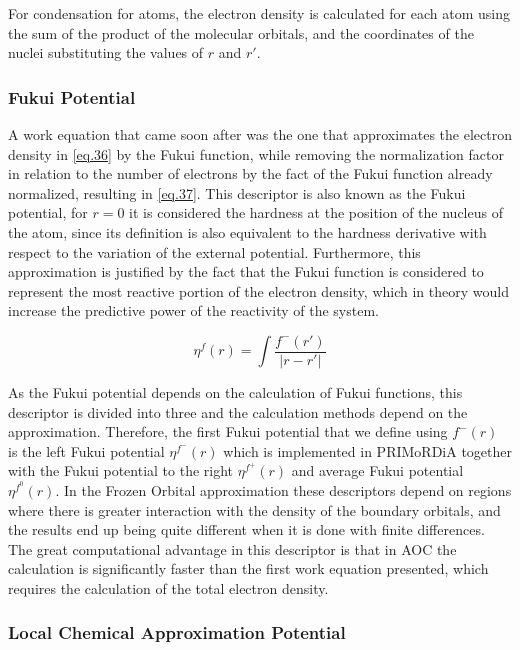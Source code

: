 \documentclass[a4paper,11pt]{refart}
\begin{document}
	For condensation for atoms, the electron density is calculated for each atom using the sum of the product of the molecular orbitals, and the coordinates of the nuclei substituting the values of $r$ and $r'$.

	\subsubsection{Fukui Potential}

	A work equation that came soon after was the one that approximates the electron density in \autoref{eq.36} by the Fukui function, while removing the normalization factor in relation to the number of electrons by the fact of the Fukui function already normalized, resulting in \autoref{eq.37}. This descriptor is also known as the Fukui potential, for $r = 0$ it is considered the hardness at the position of the nucleus of the atom, since its definition is also equivalent to the hardness derivative with respect to the variation of the external potential. Furthermore, this approximation is justified by the fact that the Fukui function is considered to represent the most reactive portion of the electron density, which in theory would increase the predictive power of the reactivity of the system.

	\begin{equation}
	\eta^f(r) = \int \frac{f^{-}(r')}{|r - r'|}
	\label{eq.37}
	\end{equation}

	As the Fukui potential depends on the calculation of Fukui functions, this descriptor is divided into three and the calculation methods depend on the approximation. Therefore, the first Fukui potential that we define using $f^-(r)$ is the left Fukui potential $\eta^{f^-}(r)$ which is implemented in PRIMoRDiA together with the Fukui potential to the right $\eta^{f^+}(r)$ and average Fukui potential $\eta^{f^0}(r)$. In the Frozen Orbital approximation these descriptors depend on regions where there is greater interaction with the density of the boundary orbitals, and the results end up being quite different when it is done with finite differences. The great computational advantage in this descriptor is that in AOC the calculation is significantly faster than the first work equation presented, which requires the calculation of the total electron density.

	\subsubsection{Local Chemical Approximation Potential}
\end{document}
